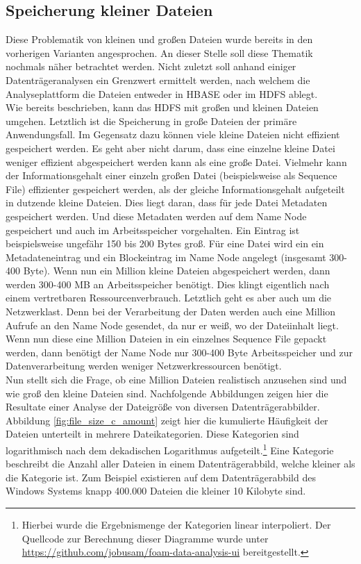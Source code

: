\subsection{Speicherung kleiner Dateien} 
Diese Problematik von kleinen und großen Dateien wurde bereits in den vorherigen Varianten angesprochen. An dieser Stelle soll diese Thematik nochmals näher betrachtet werden. Nicht zuletzt soll anhand einiger Datenträgeranalysen ein Grenzwert ermittelt werden, nach welchem die Analyseplattform die Dateien entweder in HBASE oder im HDFS ablegt.\\

\noindent
Wie bereits beschrieben, kann das HDFS mit großen und kleinen Dateien umgehen. Letztlich ist die Speicherung in große Dateien der primäre Anwendungsfall. Im Gegensatz dazu können viele kleine Dateien nicht effizient gespeichert werden. Es geht aber nicht darum, dass eine einzelne kleine Datei weniger effizient abgespeichert werden kann als eine große Datei. Vielmehr kann der Informationsgehalt einer einzeln großen Datei (beispielsweise als Sequence File) effizienter gespeichert werden, als der gleiche Informationsgehalt aufgeteilt in dutzende kleine Dateien. Dies liegt daran, dass für jede Datei Metadaten gespeichert werden. Und diese Metadaten werden auf dem Name Node gespeichert und auch im Arbeitsspeicher vorgehalten.\cite{hdfs_architecture} Ein Eintrag ist beispielsweise ungefähr 150 bis 200 Bytes groß. Für eine Datei wird ein ein Metadateneintrag und ein Blockeintrag im Name Node angelegt (insgesamt 300-400 Byte). Wenn nun ein Million kleine Dateien abgespeichert werden, dann werden 300-400 MB an Arbeitsspeicher benötigt. Dies klingt eigentlich nach einem vertretbaren Ressourcenverbrauch. Letztlich geht es aber auch um die Netzwerklast. Denn bei der Verarbeitung der Daten werden auch eine Million Aufrufe an den Name Node gesendet, da nur er weiß, wo der Dateiinhalt liegt. Wenn nun diese eine Million Dateien in ein einzelnes Sequence File gepackt werden, dann benötigt der Name Node nur 300-400 Byte Arbeitsspeicher und zur Datenverarbeitung werden weniger Netzwerkressourcen benötigt.\\

\noindent
Nun stellt sich die Frage, ob eine Million Dateien realistisch anzusehen sind und wie groß den kleine Dateien sind. Nachfolgende Abbildungen zeigen hier die Resultate einer Analyse der Dateigröße von diversen Datenträgerabbilder. Abbildung \ref{fig:file_size_c_amount} zeigt hier die kumulierte Häufigkeit der Dateien unterteilt in mehrere Dateikategorien. Diese Kategorien sind logarithmisch nach dem dekadischen Logarithmus aufgeteilt.\footnote{Hierbei wurde die Ergebnismenge der Kategorien linear interpoliert. Der Quellcode zur Berechnung dieser Diagramme wurde unter \url{https://github.com/jobusam/foam-data-analysis-ui} bereitgestellt. } Eine Kategorie beschreibt die Anzahl aller Dateien in einem Datenträgerabbild, welche kleiner als die Kategorie ist. Zum Beispiel existieren auf dem Datenträgerabbild des Windows Systems knapp 400.000 Dateien die kleiner 10 Kilobyte sind.\\


